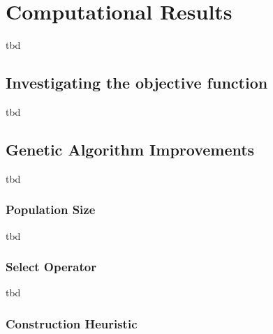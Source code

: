 %
%
%
%



\chapter{Computational Results} \label{chap:results}

tbd

\section{Investigating the objective function}

tbd

\section{Genetic Algorithm Improvements}

tbd

\subsection{Population Size}

tbd

\subsection{Select Operator}

tbd

\subsection{Construction Heuristic}

